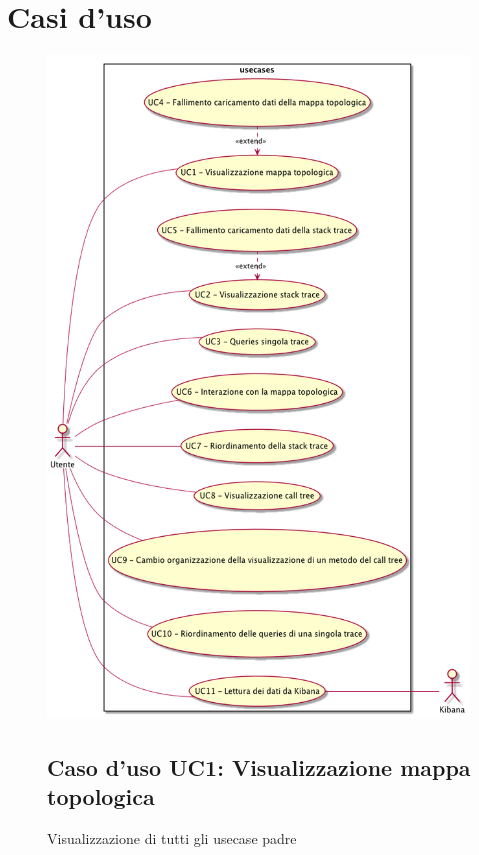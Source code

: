 \section{Casi d'uso}
\begin{figure} [H]
\centering
\includegraphics[scale=0.45]{./UC/UC.png}
\caption{Visualizzazione di tutti gli usecase padre}\label{}
\subsection{Caso d'uso UC1: Visualizzazione mappa topologica}
\end{figure}
